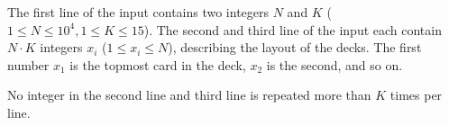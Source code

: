 
The first line of the input contains two integers $N$ and $K$ ($1 \leq N \leq 10^4, 1 \leq K \leq 15$).
The second and third line of the input each contain $N \cdot K$ integers $x_i$ ($1 \leq x_i \leq N$),
    describing the layout of the decks. The first number $x_1$ is the topmost card in the deck, $x_2$ is the second, and so on.

No integer in the second line and third line is repeated more than $K$ times per line.

